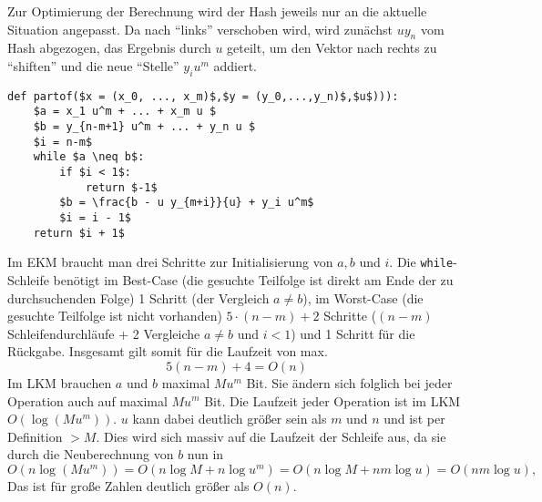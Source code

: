 \documentclass[a4paper,10pt]{scrartcl}
\begin{document}
\begin{enumerate}
         Zur Optimierung der Berechnung wird der Hash jeweils nur an die aktuelle Situation angepasst.
         Da nach "`links"' verschoben wird, wird zunächst $u y_{n}$ vom Hash abgezogen, das Ergebnis durch $u$ geteilt, um den Vektor nach rechts zu "`shiften"' und die neue "`Stelle"' $y_i u^m$ addiert.
        \begin{lstlisting}[mathescape=true]
def partof($x = (x_0, ..., x_m)$,$y = (y_0,...,y_n)$,$u$))):
    $a = x_1 u^m + ... + x_m u $
    $b = y_{n-m+1} u^m + ... + y_n u $
    $i = n-m$
    while $a \neq b$:
        if $i < 1$:
            return $-1$
        $b = \frac{b - u y_{m+i}}{u} + y_i u^m$
        $i = i - 1$
    return $i + 1$
        \end{lstlisting}
        Im EKM braucht man drei Schritte zur Initialisierung von $a, b$ und $i$. Die \lstinline!while!-Schleife benötigt im Best-Case (die gesuchte Teilfolge ist direkt am Ende der zu durchsuchenden Folge) 1 Schritt (der Vergleich $a \neq b$), im Worst-Case (die gesuchte Teilfolge ist nicht vorhanden) $5 \cdot (n-m) + 2$ Schritte ($(n-m)$  Schleifendurchläufe + 2 Vergleiche $a \neq b$ und $i < 1$) und 1 Schritt für die Rückgabe. Insgesamt gilt somit für die Laufzeit von max.
        \[5(n-m) + 4 = O(n)\] 
        Im LKM brauchen $a$ und $b$ maximal $M u^m$ Bit. Sie ändern sich folglich bei jeder Operation auch auf maximal $M u^m$ Bit. Die Laufzeit jeder Operation ist im LKM  $O(\log(Mu^m))$.
$u$ kann dabei deutlich größer sein als $m$ und $n$ und ist per Definition $> M$. Dies wird sich massiv auf die Laufzeit der Schleife aus, da sie durch die Neuberechnung von $b$ nun
        in \[O(n \log(Mu^m)) = O(n \log M + n \log u^m) = O(n \log M + n m \log u) = O(n m \log u),\] Das ist für große Zahlen deutlich größer als $O(n)$.
\end{enumerate}
\end{document}
